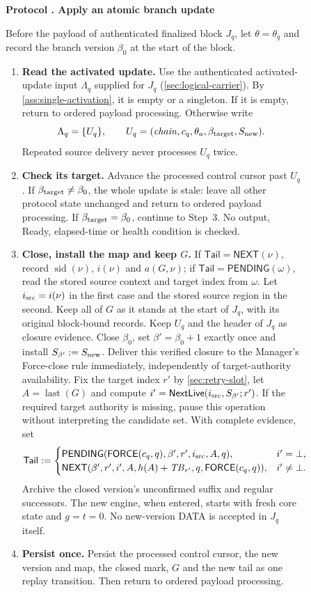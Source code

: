 \documentclass[11pt,a4paper]{article}
\newcommand{\TB}{\mathit{TB}}
\newcommand{\tagg}[1]{\ensuremath{\mathsf{#1}}}
\newcounter{protocol}
\newenvironment{protocol}[3][htbp]{\begin{figure}[#1]\refstepcounter{protocol}\label{#2}
\begin{mdframed}[linewidth=.6pt,skipabove=0pt,skipbelow=0pt,
innertopmargin=7pt,innerbottommargin=7pt]\small
\textbf{Protocol \theprotocol. #3}\par\smallskip}{\end{mdframed}\end{figure}}
\begin{document}
\begin{protocol}{alg:force}{Apply an atomic branch update}
Before the payload of authenticated finalized block $J_q$, let
$\theta=\theta_q$ and record the branch version $\beta_0$ at the start
of the block.
\begin{enumerate}[label=\textbf{\arabic*)},itemsep=3pt]
\item \textbf{Read the activated update.}
Use the authenticated activated-update input $\Lambda_q$ supplied for
$J_q$ (\cref{sec:logical-carrier}). By \cref{ass:single-activation}, it is empty
or a singleton. If it is empty, return to ordered payload processing.
Otherwise write
\[
 \Lambda_q=\{U_q\},\qquad
 U_q=(\mathit{chain},c_q,\theta_a,\beta_{\rm target},S_{\rm new}).
\]
Repeated source delivery never processes $U_q$ twice.

\item \textbf{Check its target.}
Advance the processed control cursor past $U_q$. If
$\beta_{\rm target}\ne\beta_0$, the whole update is stale: leave all
other protocol state unchanged and return to ordered payload processing. If
$\beta_{\rm target}=\beta_0$, continue to Step~3. No output, Ready,
elapsed-time or health condition is checked.

\item \textbf{Close, install the map and keep $G$.}
If $\mathsf{Tail}=\tagg{NEXT}(\nu)$, record
$\operatorname{sid}(\nu)$, $i(\nu)$ and $a(G,\nu)$; if
$\mathsf{Tail}=\tagg{PENDING}(\omega)$, read the stored source context
and target index from $\omega$.  Let $i_{\rm src}=i(\nu)$ in the first
case and the stored source region in the second. Keep all of $G$ as it
stands at the start of $J_q$, with its original block-bound records. Keep
$U_q$ and the header of $J_q$ as closure evidence. Close $\beta_0$, set
$\beta'=\beta_0+1$ exactly once and install
$S_{\beta'}:=S_{\rm new}$. Deliver this verified closure to the Manager's
Force-close rule immediately, independently of target-authority
availability. Fix the
target index $r'$ by \cref{sec:retry-slot}, let
$A=\operatorname{last}(G)$ and compute
$i'=\tagg{NextLive}(i_{\rm src},S_{\beta'};r')$. If the required target
authority is missing, pause this operation without interpreting the
candidate set. With complete evidence, set
\[
 \mathsf{Tail}:=
 \begin{cases}
 \tagg{PENDING}(\tagg{FORCE}(c_q,q),\beta',r',i_{\rm src},A,q),
   & i'=\bot,\\
 \tagg{NEXT}(\beta',r',i',A,h(A)+\TB_{r'},q,
              \tagg{FORCE}(c_q,q)),& i'\ne\bot.
 \end{cases}
\]
Archive the closed version's unconfirmed suffix and regular successors.
The new engine, when entered, starts with fresh core state and $g=t=0$.
No new-version DATA is accepted in $J_q$ itself.

\item \textbf{Persist once.}
Persist the processed control cursor, the new version and map, the closed
mark, $G$ and the new tail as one replay transition. Then return to
ordered payload processing.
\end{enumerate}
\end{protocol}
\end{document}
